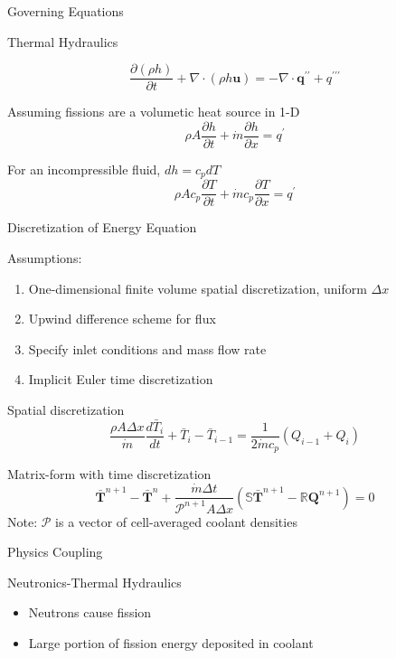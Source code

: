 \documentclass{beamer}
\begin{document}
\begin{section}{Governing Equations}
\begin{frame}{Thermal Hydraulics}
\begin{customlist}{2ex}{0pt}
  \[
   \frac{\partial\left(\rho h\right)}{\partial t}+\nabla\cdot\left(\rho h\mathbf{u}\right)=-\nabla\cdot\mathbf{q}^{\prime\prime}+q^{\prime\prime\prime}
  \]
  \vfill\item Assuming fissions are a volumetic heat source in 1-D
  \[
   \rho A\frac{\partial h}{\partial t}+\dot{m}\frac{\partial h}{\partial x}=q^{\prime}
  \]
  \vfill\item For an incompressible fluid, $dh=c_{p}dT$
  \[
   \rho Ac_{p}\frac{\partial T}{\partial t}+\dot{m}c_{p}\frac{\partial T}{\partial x}=q^{\prime}
  \]
\end{customlist}
\end{frame}
\begin{frame}{Discretization of Energy Equation}
\begin{block}{Assumptions:}
\begin{enumerate}
  \item One-dimensional finite volume spatial discretization, uniform $\Delta x$
  \item Upwind difference scheme for flux
  \item Specify inlet conditions and mass flow rate
  \item Implicit Euler time discretization
\end{enumerate}
\end{block}
\begin{customlist}{2ex}{0pt}
  \item Spatial discretization
  \[
   \frac{\rho A\Delta x}{\dot{m}}\frac{d\bar{T}_{i}}{dt}+\bar{T}_{i}-\bar{T}_{i-1}=\frac{1}{2 \dot{m} c_{p}}\left(Q_{i-1}+Q_{i}\right)
  \]
  \item Matrix-form with time discretization
  \[
   \mathbf{\bar{T}}^{n+1}-\mathbf{\bar{T}}^{n}+\frac{\dot{m} \Delta t}{\mathcal{P}^{n+1}A\Delta x}\left(\mathbb{S}\mathbf{\bar{T}}^{n+1}-\mathbb{R}\mathbf{Q}^{n+1}\right)=0
  \]
  \alert{Note:} $\mathcal{P}$ is a vector of cell-averaged coolant densities
\end{customlist}
\end{frame}
\begin{frame}{Physics Coupling}
\begin{block}{Neutronics-Thermal Hydraulics}
  \begin{itemize}
    \item Neutrons cause fission
    \item Large portion of fission energy deposited in coolant

\end{itemize}
\end{block}
\end{frame}
\end{section}
\end{document}
